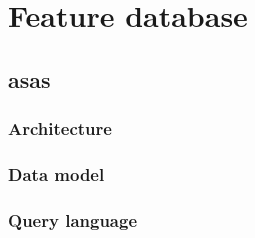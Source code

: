 \section{Feature database}

\subsection{asas}



\subsubsection{Architecture}


\subsubsection{Data model}


\subsubsection{Query language}